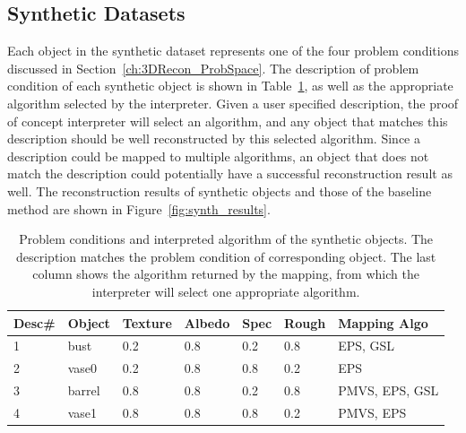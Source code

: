\subsection{Synthetic Datasets}
Each object in the synthetic dataset represents one of the four problem conditions discussed in Section~\ref{ch:3DRecon_ProbSpace}. The description of problem condition of each synthetic object is shown in Table~\ref{tab:synth_prop_list}, as well as the appropriate algorithm selected by the interpreter. Given a user specified description, the proof of concept interpreter will select an algorithm, and any object that matches this description should be well reconstructed by this selected algorithm. Since a description could be mapped to multiple algorithms, an object that does not match the description could potentially have a successful reconstruction result as well. The reconstruction results of synthetic objects and those of the baseline method are shown in Figure~\ref{fig:synth_results}.
\begin{table}[!htbp]
  \centering
  \begin{tabular}{lllllll}
  \hline
  \textbf{Desc\#} & \textbf{Object} & Texture & Albedo & Spec & Rough & Mapping Algo\\
  \hline
  1 & bust & 0.2 & 0.8 & 0.2 & 0.8 & EPS, GSL\\
  2 & vase0 & 0.2 & 0.8 & 0.8 & 0.2 & EPS\\
  3 & barrel & 0.8 & 0.8 & 0.2 & 0.8 & PMVS, EPS, GSL\\
  4 & vase1 & 0.8 & 0.8 & 0.8 & 0.2 & PMVS, EPS\\
  \hline
  \end{tabular}
  \caption{Problem conditions and interpreted algorithm of the synthetic objects. The description matches the problem condition of corresponding object. The last column shows the algorithm returned by the mapping, from which the interpreter will select one appropriate algorithm.}
  \label{tab:synth_prop_list}
\end{table}

